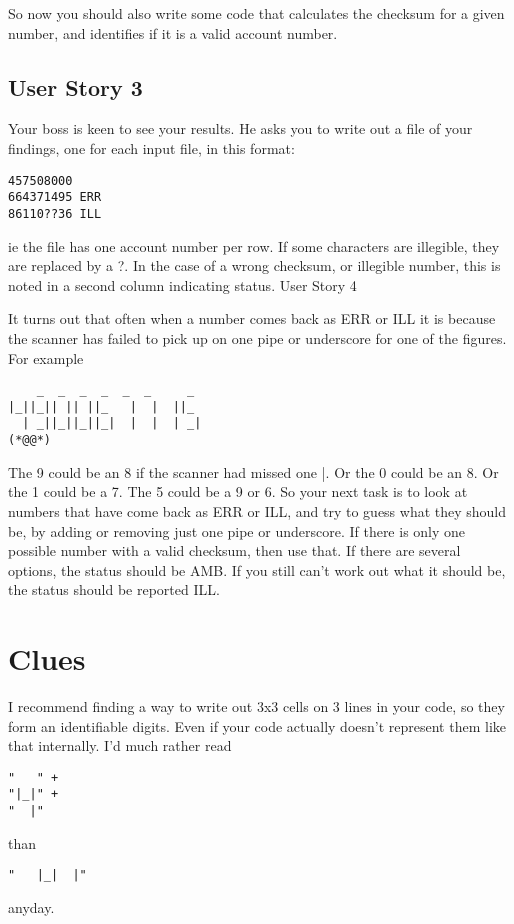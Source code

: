 So now you should also write some code that calculates the checksum for a given number, and identifies if it is a valid account number.

\subsection{User Story 3}

Your boss is keen to see your results. He asks you to write out a file of your findings, one for each input file, in this format:

\begin{lstlisting}
457508000
664371495 ERR
86110??36 ILL
\end{lstlisting}

ie the file has one account number per row. If some characters are illegible, they are replaced by a ?. In the case of a wrong checksum, or illegible number, this is noted in a second column indicating status.
User Story 4

It turns out that often when a number comes back as ERR or ILL it is because the scanner has failed to pick up on one pipe or underscore for one of the figures. For example

\begin{lstlisting}
    _  _  _  _  _  _     _ 
|_||_|| || ||_   |  |  ||_ 
  | _||_||_||_|  |  |  | _|
(*@@*)
\end{lstlisting}
The 9 could be an 8 if the scanner had missed one |. Or the 0 could be an 8. Or the 1 could be a 7. The 5 could be a 9 or 6. So your next task is to look at numbers that have come back as ERR or ILL, and try to guess what they should be, by adding or removing just one pipe or underscore. If there is only one possible number with a valid checksum, then use that. If there are several options, the status should be AMB. If you still can’t work out what it should be, the status should be reported ILL.
\pagebreak

\section{Clues}

I recommend finding a way to write out 3x3 cells on 3 lines in your code, so they form an identifiable digits. Even if your code actually doesn’t represent them like that internally. I’d much rather read

\begin{lstlisting}
"   " +
"|_|" +
"  |"
\end{lstlisting}
than
\begin{lstlisting}
"   |_|  |" 
\end{lstlisting}
anyday.

